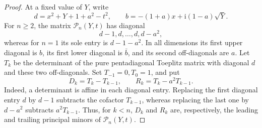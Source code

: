 \documentclass[12pt,anonymous]{iopjournal}
\numberwithin{equation}{section}
\theoremstyle{remark}
\newcommand{\ii}{\mathrm i}
\begin{document}
\begin{proof}
At a fixed value of \(Y\), write
\[
 d=x^2+Y+1+a^2-t^2,
 \qquad b=-(1+a)x+\ii(1-a)\sqrt Y.
\]
For \(n\geq2\), the matrix \(\mathcal P_n(Y,t)\) has diagonal
\[
 d-1,d,\ldots,d,d-a^2,
\]
whereas for \(n=1\) its sole entry is \(d-1-a^2\).  In all dimensions
its first upper diagonal is \(b\), its first lower diagonal is \(\bar b\),
and its second off-diagonals are \(a\).  Let \(T_k\) be the determinant of
the pure pentadiagonal Toeplitz matrix with diagonal \(d\) and these two
off-diagonals.  Set \(T_{-1}=0,T_0=1\), and put
\begin{equation}\label{eq:D-R-def}
 D_k=T_k-T_{k-1},\qquad R_k=T_k-a^2T_{k-1}.
\end{equation}
Indeed, a determinant is affine in each diagonal entry.  Replacing the
first diagonal entry \(d\) by \(d-1\) subtracts the cofactor
\(T_{k-1}\), whereas replacing the last one by \(d-a^2\) subtracts
\(a^2T_{k-1}\).  Thus, for \(k<n\), \(D_k\) and \(R_k\) are,
respectively, the leading and trailing principal minors of
\(\mathcal P_n(Y,t)\).


\end{proof}
\end{document}
